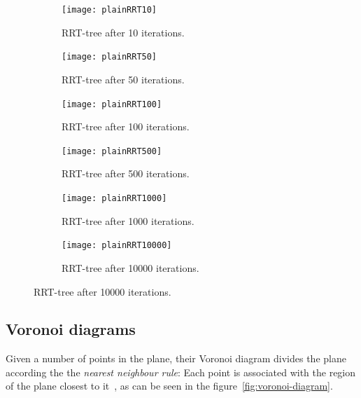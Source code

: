 \begin{figure}
  \label{fig:rrt-expansion}
  \centering
  \begin{subfigure}[b]{0.3\textwidth}
    \texttt{[image: plainRRT10]}
    \caption{RRT-tree after 10 iterations.}
  \end{subfigure}
  \begin{subfigure}[b]{0.3\textwidth}
    \texttt{[image: plainRRT50]}
    \caption{RRT-tree after 50 iterations.}
  \end{subfigure}
  \begin{subfigure}[b]{0.3\textwidth}
    \texttt{[image: plainRRT100]}
    \caption{RRT-tree after 100 iterations.}
  \end{subfigure}
  \newline %
  \begin{subfigure}[b]{0.3\textwidth}
    \texttt{[image: plainRRT500]}
    \caption{RRT-tree after 500 iterations.}
  \end{subfigure}
  \begin{subfigure}[b]{0.3\textwidth}
    \texttt{[image: plainRRT1000]}
    \caption{RRT-tree after 1000 iterations.}
  \end{subfigure}
  \begin{subfigure}[b]{0.3\textwidth}
    \texttt{[image: plainRRT10000]}
    \caption{RRT-tree after 10000 iterations.}
  \end{subfigure}
\end{figure}

\subsection{Voronoi diagrams}
\label{subsec:voronoi regions}

Given a number of points in the plane, their Voronoi diagram divides the plane
according the the \textit{nearest neighbour rule}: Each point is associated with
the region of the plane closest to
it~\cite{aurenhammerVoronoiDiagramsSurvey1991}, as can be seen in the
figure~\ref{fig:voronoi-diagram}.

